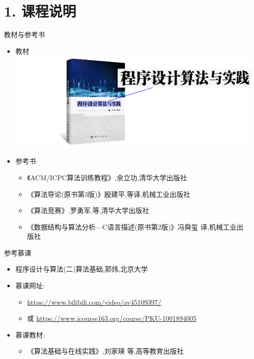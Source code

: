


\frame{\titlepage}
\section{1. 课程说明}
\begin{frame}{教材与参考书}
    \begin{itemize}
        \item[\faBook] 教材
        \includegraphics{fig/1-0.pdf}       
        \item[\faBook] 参考书
        \begin{itemize}
            \item[\faBookOpen] 《ACM/ICPC算法训练教程》,余立功,清华大学出版社
            \item[\faBookOpen] 《算法导论(原书第3版)》殷建平,等译,机械工业出版社
            \item[\faBookOpen] 《算法竞赛》,罗勇军,等,清华大学出版社
            \item[\faBookOpen] 《数据结构与算法分析—C语言描述(原书第2版)》冯舜玺 译,机械工业出版社
        \end{itemize}
    \end{itemize}
\end{frame}
\begin{frame}{参考慕课}
    \begin{itemize}
        \item[\faVideo] 程序设计与算法(二)算法基础,郭炜,北京大学
        \vfill
        \item[\faInternetExplorer] 慕课网址:
        \begin{itemize}
            \item[\faLink] \url{https://www.bilibili.com/video/av45109397/}
            \item[\faLink] 或 \url{https://www.icourse163.org/course/PKU-1001894005}
        \end{itemize}
        \vfill
        \item[\faBook] 慕课教材:
        \begin{itemize}
            \item[\faBookOpen] 《算法基础与在线实践》,刘家瑛 等,高等教育出版社
        \end{itemize}
    \end{itemize}
\end{frame}

